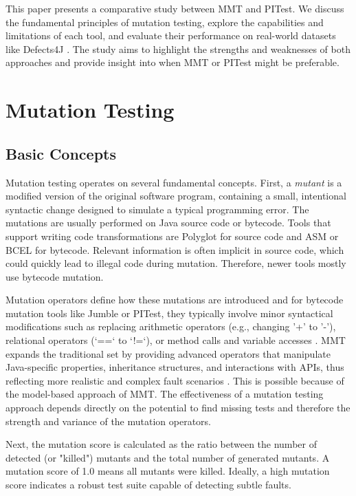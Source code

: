 \documentclass[12pt,a4paper]{article}
\begin{document}
This paper presents a comparative study between MMT and PITest. We discuss
the fundamental principles of mutation testing, explore the capabilities and
limitations of each tool, and evaluate their performance on real-world
datasets like Defects4J \cite{just_defects4j_2014}. The study aims to
highlight the strengths and weaknesses of both approaches and provide insight
into when MMT or PITest might be preferable.

\section{Mutation Testing}

\subsection{Basic Concepts}
Mutation testing operates on several fundamental concepts.
First, a \textit{mutant} is a modified version of the original software
program, containing a small, intentional syntactic change designed to simulate
a typical programming error. The mutations are usually performed on Java
source code or bytecode. Tools that support writing code transformations are
Polyglot for source code and ASM or BCEL for bytecode. Relevant information
is often implicit in source code, which could quickly lead to illegal code
during mutation. Therefore, newer tools mostly use bytecode mutation.

Mutation operators define how these mutations are introduced and for
bytecode mutation tools like Jumble or PITest, they typically involve minor
syntactical modifications such as replacing arithmetic operators (e.g.,
changing '+' to '-'), relational operators (`==` to `!=`), or method calls
and variable accesses \cite{offutt_mutation_2001}. MMT expands the
traditional set by providing advanced operators that manipulate Java-specific
properties, inheritance structures, and interactions with APIs, thus
reflecting more realistic and complex fault scenarios
\cite{bockisch_mmt_2024}. This is possible because of the model-based
approach of MMT\@. The effectiveness of a mutation testing approach depends
directly on the potential to find missing tests and therefore the strength
and variance of the mutation operators.

Next, the mutation score is calculated as the ratio between the number of
detected (or "killed") mutants and the total number of generated mutants. A
mutation score of 1.0 means all mutants were killed. Ideally, a high
mutation score indicates a robust test suite capable of detecting subtle
faults.
\end{document}

